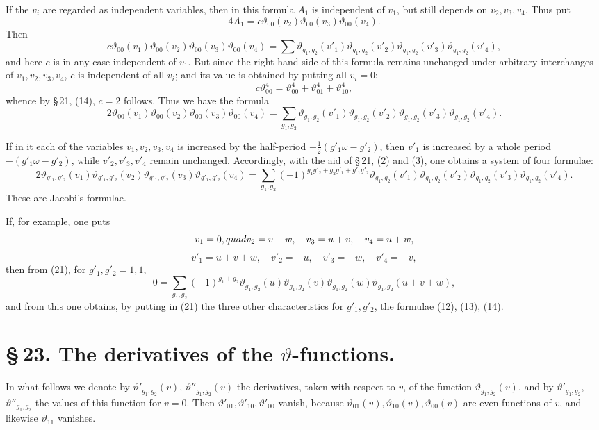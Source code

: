 \documentclass[11pt]{article}
\newcommand{\tht}{\vartheta}
\begin{document}
If the $v_i$ are regarded as independent variables, then in this formula $A_1$ is independent of $v_1$, but still depends on $v_2,v_3,v_4$. Thus put
\[
4A_1=c\tht_{00}(v_2)\tht_{00}(v_3)\tht_{00}(v_4).
\]
Then
\[
c\tht_{00}(v_1)\tht_{00}(v_2)\tht_{00}(v_3)\tht_{00}(v_4)
=\sum\tht_{g_1,g_2}(v'_1)\tht_{g_1,g_2}(v'_2)\tht_{g_1,g_2}(v'_3)\tht_{g_1,g_2}(v'_4),
\]
and here $c$ is in any case independent of $v_1$. But since the right hand side of this formula remains unchanged under arbitrary interchanges of $v_1,v_2,v_3,v_4$, $c$ is independent of all $v_i$; and its value is obtained by putting all $v_i=0$:
\[
c\tht_{00}^{4}=\tht_{00}^{4}+\tht_{01}^{4}+\tht_{10}^{4},
\]
whence by \S\,21, (14), $c=2$ follows. Thus we have the formula
\[
2\tht_{00}(v_1)\tht_{00}(v_2)\tht_{00}(v_3)\tht_{00}(v_4)
=\sum_{g_1,g_2}\tht_{g_1,g_2}(v'_1)\tht_{g_1,g_2}(v'_2)\tht_{g_1,g_2}(v'_3)\tht_{g_1,g_2}(v'_4).
\]

If in it each of the variables $v_1,v_2,v_3,v_4$ is increased by the half-period $-\frac12(g'_1\omega-g'_2)$, then $v'_1$ is increased by a whole period $-(g'_1\omega-g'_2)$, while $v'_2,v'_3,v'_4$ remain unchanged. Accordingly, with the aid of \S\,21, (2) and (3), one obtains a system of four formulae:
\begin{equation}
2\tht_{g'_1,g'_2}(v_1)\tht_{g'_1,g'_2}(v_2)\tht_{g'_1,g'_2}(v_3)\tht_{g'_1,g'_2}(v_4)
=\sum_{g_1,g_2}(-1)^{g_1g'_2+g_2g'_1+g'_1g'_2}
\tht_{g_1,g_2}(v'_1)\tht_{g_1,g_2}(v'_2)\tht_{g_1,g_2}(v'_3)\tht_{g_1,g_2}(v'_4).
\tag{21}
\end{equation}
These are Jacobi's formulae.

If, for example, one puts
\[
v_1=0,\\quad v_2=v+w,\quad v_3=u+v,\quad v_4=u+w,
\]
\[
v'_1=u+v+w,\quad v'_2=-u,\quad v'_3=-w,\quad v'_4=-v,
\]
then from (21), for $g'_1,g'_2=1,1$,
\[
0=\sum_{g_1,g_2}(-1)^{g_1+g_2}
\tht_{g_1,g_2}(u)\tht_{g_1,g_2}(v)\tht_{g_1,g_2}(w)\tht_{g_1,g_2}(u+v+w),
\]
and from this one obtains, by putting in (21) the three other characteristics for $g'_1,g'_2$, the formulae (12), (13), (14).

\section*{\S\,23. The derivatives of the $\vartheta$-functions.}

In what follows we denote by $\tht'_{g_1,g_2}(v)$, $\tht''_{g_1,g_2}(v)$ the derivatives, taken with respect to $v$, of the function $\tht_{g_1,g_2}(v)$, and by $\tht'_{g_1,g_2}$, $\tht''_{g_1,g_2}$ the values of this function for $v=0$. Then $\tht'_{01},\tht'_{10},\tht'_{00}$ vanish, because $\tht_{01}(v),\tht_{10}(v),\tht_{00}(v)$ are even functions of $v$, and likewise $\tht_{11}$ vanishes.
\end{document}
